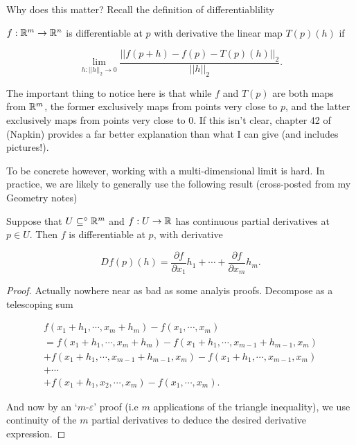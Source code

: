 \documentclass[11pt]{scrartcl}
\begin{document}
Why does this matter? Recall the definition of differentiablility

\begin{definition}

$f: \mathbb R^m \to \mathbb R^n$ is differentiable at $p$ with derivative the linear map $T(p)(h)$ if 

\begin{equation}
    \lim_{h : ||h||_2 \rightarrow 0} \frac{ || f(p + h) - f(p) - T(p)(h) ||_2 }{||h||_2}.
\end{equation}

\label{derivvers}
\end{definition}

The important thing to notice here is that while $f$ and $T(p)$ are both maps from $\mathbb R^m$, the former exclusively maps from points very close to $p$, and the latter exclusively maps from points very close to 0. If this isn't clear, chapter 42 of \cite{Napkin} (Napkin) provides a far better explanation than what I can give (and includes pictures!).

To be concrete however, working with a multi-dimensional limit is hard. In practice, we are likely to generally use the following result (cross-posted from my Geometry notes)

\begin{theorem}
        Suppose that $U \subseteq^\circ \mathbb R^m$ and $f : U \rightarrow \mathbb R$ has continuous partial derivatives at $p \in U$. Then $f$ is differentiable at $p$, with derivative
        
        \begin{equation}
            Df(p)(h) = \frac{\partial f}{\partial x_1}h_1 + \cdots + \frac{\partial f}{\partial x_m}h_m.
            \label{Deriv1}
        \end{equation}
    
        \begin{proof}
            Actually nowhere near as bad as some analyis proofs. Decompose as a telescoping sum
    
            \begin{align}
            f(x_1 + h_1, \cdots , x_m + h_m) - f(x_1, \cdots , x_m) \\ 
            = f(x_1 + h_1, \cdots , x_m + h_m) - f(x_1 + h_1, \cdots , x_{m-1} + h_{m-1} , x_m) \\
            + f(x_1 + h_1, \cdots , x_{m-1} + h_{m-1}, x_m) - f(x_1 + h_1, \cdots , x_{m-1}, x_m) \\
            + \cdots \\
            + f(x_1 + h_1, x_2, \cdots , x_m) - f(x_1, \cdots , x_m).
            \end{align}
    
            And now by an `$m$-$\varepsilon$' proof (i.e $m$ applications of the triangle inequality), we use continuity of the $m$ partial derivatives to deduce the desired derivative expression.
        \end{proof}
    \label{extracting derivatives}
\end{theorem}
\end{document}
